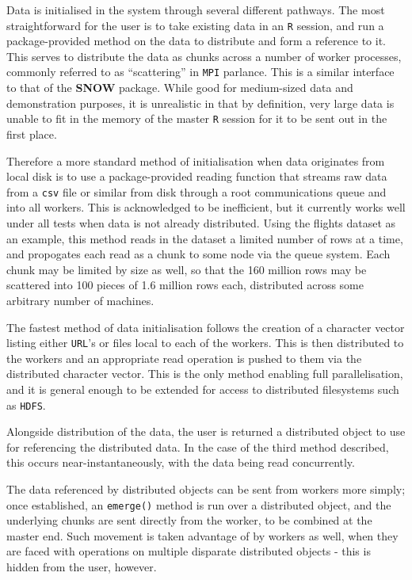 Data is initialised in the system through several different pathways.
The most straightforward for the user is to take existing data in an \texttt{R} session, and run a package-provided method on the data to distribute and form a reference to it.
This serves to distribute the data as chunks across a number of worker processes, commonly referred to as ``scattering'' in \texttt{MPI} parlance\cite{walker1996mpi}.
This is a similar interface to that of the \textbf{SNOW} package\cite{tierney18}.
While good for medium-sized data and demonstration purposes, it is unrealistic in that by definition, very large data is unable to fit in the memory of the master \texttt{R} session for it to be sent out in the first place.

Therefore a more standard method of initialisation when data originates from local disk is to use a package-provided reading function that streams raw data from a \texttt{csv} file or similar from disk through a root communications queue and into all workers.
This is acknowledged to be inefficient, but it currently works well under all tests when data is not already distributed.
Using the flights dataset as an example, this method reads in the dataset a limited number of rows at a time, and propogates each read as a chunk to some node via the queue system.
Each chunk may be limited by size as well, so that the 160 million rows may be scattered into 100 pieces of 1.6 million rows each, distributed across some arbitrary number of machines.

The fastest method of data initialisation follows the creation of a character vector listing either \texttt{URL}'s or files local to each of the workers.
This is then distributed to the workers and an appropriate read operation is pushed to them via the distributed character vector.
This is the only method enabling full parallelisation, and it is general enough to be extended for access to distributed filesystems such as \texttt{HDFS}.

Alongside distribution of the data, the user is returned a distributed object to use for referencing the distributed data.
In the case of the third method described, this occurs near-instantaneously, with the data being read concurrently.

The data referenced by distributed objects can be sent from workers more simply; once established, an \texttt{emerge()} method is run over a distributed object, and the underlying chunks are sent directly from the worker, to be combined at the master end.
Such movement is taken advantage of by workers as well, when they are faced with operations on multiple disparate distributed objects - this is hidden from the user, however.

